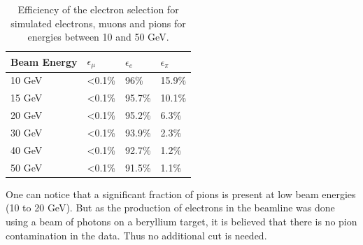 \begin{table}[htb!]
	\centering
	\caption{Efficiency of the electron selection for simulated electrons, muons and pions for energies between 10 and 50 GeV.}
	\label{table:eff_electron}
	\begin{tabular}{@{} llll @{}}
		\hline
		\textbf{Beam Energy} & \textbf{$\epsilon_{\mu}$} & \textbf{$\epsilon_{e}$} & \textbf{$\epsilon_{\pi}$}\\
		\hline
		10 GeV & <0.1\% & 96\% & 15.9\%\\
		15 GeV & <0.1\% & 95.7\% & 10.1\%\\
		20 GeV & <0.1\% & 95.2\% & 6.3\%\\
		30 GeV & <0.1\% & 93.9\% & 2.3\%\\
		40 GeV & <0.1\% & 92.7\% & 1.2\%\\
		50 GeV & <0.1\% & 91.5\% & 1.1\%\\
		\hline
	\end{tabular}
\end{table}

One can notice that a significant fraction of pions is present at low beam energies (10 to 20 GeV). But as the production of electrons in the beamline was done using a beam of photons on a beryllium target, it is believed that there is no pion contamination in the data. Thus no additional cut is needed.

